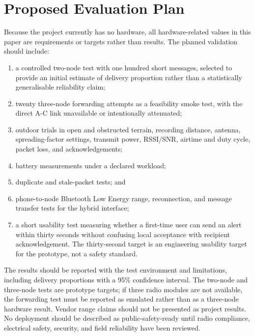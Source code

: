 \documentclass[journal]{IEEEtran}
\begin{document}
\section{Proposed Evaluation Plan}
Because the project currently has no hardware, all hardware-related values in
this paper are requirements or targets rather than results. The planned
validation should include:
\begin{enumerate}
  \item a controlled two-node test with one hundred short messages, selected
  to provide an initial estimate of delivery proportion rather than a
  statistically generalisable reliability claim;
  \item twenty three-node forwarding attempts as a feasibility smoke test,
  with the direct A-C link unavailable or intentionally attenuated;
  \item outdoor trials in open and obstructed terrain, recording distance,
  antenna, spreading-factor settings, transmit power, RSSI/SNR, airtime and
  duty cycle, packet loss, and acknowledgements;
  \item battery measurements under a declared workload;
  \item duplicate and stale-packet tests; and
  \item phone-to-node Bluetooth Low Energy range, reconnection, and message
  transfer tests for the hybrid interface;
  \item a short usability test measuring whether a first-time user can send
  an alert within thirty seconds without confusing local acceptance with
  recipient acknowledgement. The thirty-second target is an engineering
  usability target for the prototype, not a safety standard.
\end{enumerate}

The results should be reported with the test environment and limitations,
including delivery proportions with a 95\% confidence interval. The two-node
and three-node tests are prototype targets; if three radio modules are not
available, the forwarding test must be reported as emulated rather than as a
three-node hardware result. Vendor range claims should not be presented as
project results. No deployment
should be described as public-safety-ready until radio compliance, electrical
safety, security, and field reliability have been reviewed.
\end{document}
